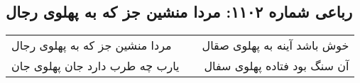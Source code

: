 \begin{center}
\section*{رباعی شماره ۱۱۰۲: مردا منشین جز که به پهلوی رجال}
\label{sec:1102}
\begin{longtable}{l p{0.5cm} r}
مردا منشین جز که به پهلوی رجال
&&
خوش باشد آینه به پهلوی صقال
\\
یارب چه طرب دارد جان پهلوی جان
&&
آن سنگ بود فتاده پهلوی سفال
\\
\end{longtable}
\end{center}
